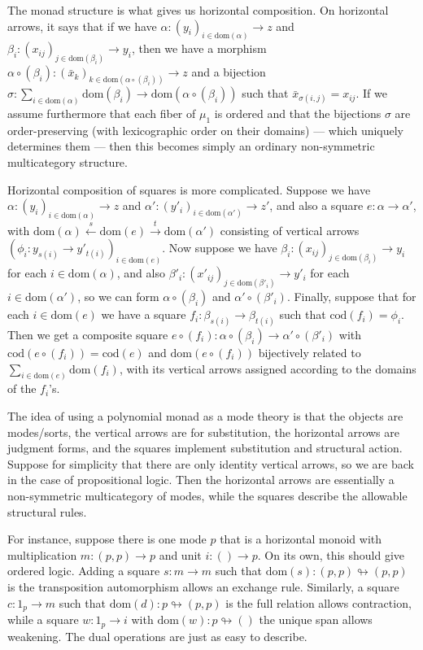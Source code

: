 \documentclass{article}
\theoremstyle{definition}
\let\sto\looparrowright
\def\dom{\mathrm{dom}}
\def\cod{\mathrm{cod}}
\let\xto\xrightarrow
\let\xot\xleftarrow
\begin{document}
The monad structure is what gives us horizontal composition.
On horizontal arrows, it says that if we have $\alpha : (y_i)_{i\in\dom(\alpha)} \to z$ and $\beta_i : (x_{ij})_{j\in \dom(\beta_i)} \to y_i$, then we have a morphism $\alpha \circ (\beta_i) : (\bar x_k)_{k\in \dom(\alpha \circ (\beta_i))} \to z$ and a bijection $\sigma : \sum_{i\in \dom(\alpha)} \dom(\beta_i) \to \dom(\alpha \circ (\beta_i))$ such that $\bar x_{\sigma(i,j)} = x_{ij}$.
If we assume furthermore that each fiber of $\mu_1$ is ordered and that the bijections $\sigma$ are order-preserving (with lexicographic order on their domains) --- which uniquely determines them --- then this becomes simply an ordinary non-symmetric multicategory structure.

Horizontal composition of squares is more complicated.
Suppose we have $\alpha : (y_i)_{i\in\dom(\alpha)} \to z$ and $\alpha' : (y'_i)_{i\in\dom(\alpha')} \to z'$, and also a square $e:\alpha\to \alpha'$, with $\dom(\alpha) \xot{s} \dom(e) \xto{t} \dom(\alpha')$ consisting of vertical arrows $(\phi_i : y_{s(i)} \to y'_{t(i)})_{i\in \dom(e)}$.
Now suppose we have $\beta_i : (x_{ij})_{j\in \dom(\beta_i)} \to y_i$ for each $i\in\dom(\alpha)$, and also $\beta'_i : (x'_{ij})_{j\in \dom(\beta'_i)} \to y'_i$ for each $i\in\dom(\alpha')$, so we can form $\alpha \circ (\beta_i)$ and $\alpha' \circ (\beta'_i)$.
Finally, suppose that for each $i\in \dom(e)$ we have a square $f_i : \beta_{s(i)} \to \beta_{t(i)}$ such that $\cod(f_i) = \phi_i$.
Then we get a composite square $e\circ (f_i) : \alpha \circ (\beta_i) \to \alpha' \circ (\beta'_i)$ with $\cod(e\circ (f_i)) = \cod(e)$ and $\dom(e\circ(f_i))$ bijectively related to $\sum_{i\in \dom(e)} \dom(f_i)$, with its vertical arrows assigned according to the domains of the $f_i$'s.

The idea of using a polynomial monad as a mode theory is that the objects are modes/sorts, the vertical arrows are for substitution, the horizontal arrows are judgment forms, and the squares implement substitution and structural action.
Suppose for simplicity that there are only identity vertical arrows, so we are back in the case of propositional logic.
Then the horizontal arrows are essentially a non-symmetric multicategory of modes, while the squares describe the allowable structural rules.

For instance, suppose there is one mode $p$ that is a horizontal monoid with multiplication $m:(p,p)\to p$ and unit $i:()\to p$.
On its own, this should give ordered logic.
Adding a square $s:m\to m$ such that $\dom(s) : (p,p) \sto (p,p)$ is the transposition automorphism allows an exchange rule.
Similarly, a square $c:1_p \to m$ such that $\dom(d): p \sto (p,p)$ is the full relation allows contraction, while a square $w:1_p \to i$ with $\dom(w):p \sto ()$ the unique span allows weakening.
The dual operations are just as easy to describe.
\end{document}
